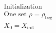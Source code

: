 \documentclass[preview]{standalone}
\begin{document}
\begin{align*}
\text{Initialization}\\ \text{One set } \rho = \rho_{\text{beg}}\\ X_0 = X_{\text{init}}
\end{align*}
\end{document}
